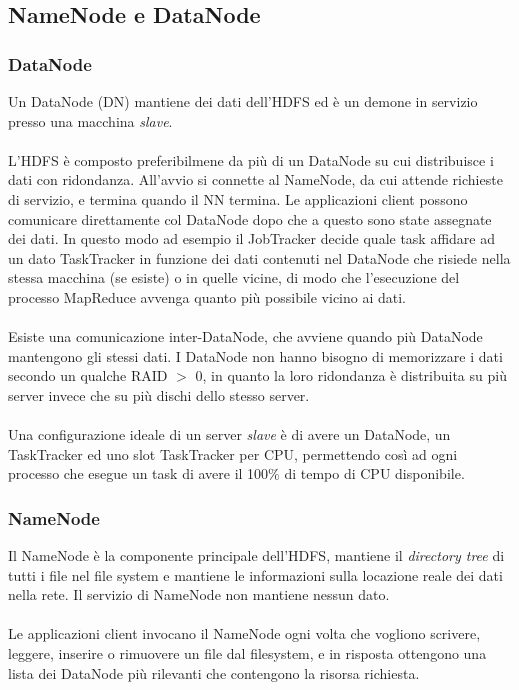 \documentclass[a4paper,11pt]{report}
\begin{document}
\subsection{NameNode e DataNode}
\subsubsection{DataNode}
Un DataNode (DN) mantiene dei dati dell'HDFS ed è un demone in servizio presso una macchina \emph{slave}. 
\paragraph{}
L'HDFS è composto preferibilmene da  più di un DataNode
su cui distribuisce i dati con ridondanza. All'avvio si connette al NameNode, da cui attende richieste di servizio, e termina quando il NN
termina.
Le applicazioni client possono comunicare direttamente col DataNode dopo che a questo sono state assegnate dei dati. In questo modo ad
esempio il JobTracker decide
quale task affidare ad un dato TaskTracker in funzione dei dati contenuti nel DataNode che risiede nella stessa macchina (se esiste) o in
quelle vicine, di modo che l'esecuzione del
processo MapReduce avvenga quanto più possibile vicino ai dati.
\paragraph{}
Esiste una comunicazione inter-DataNode, che avviene quando più DataNode mantengono gli stessi dati.
I DataNode non hanno bisogno di memorizzare i dati secondo un qualche RAID $>$ 0, in quanto la loro ridondanza è distribuita su più server
invece che su più dischi dello stesso server.
\paragraph{}
Una configurazione ideale di un server \emph{slave} è di avere un DataNode, un TaskTracker ed uno slot TaskTracker per CPU, permettendo così
ad ogni processo che esegue un task di 
avere il 100\% di tempo di CPU disponibile.
\subsubsection{NameNode}
Il NameNode è la componente principale dell'HDFS, mantiene il \emph{directory tree} di tutti i file nel file system e mantiene le
informazioni sulla locazione reale dei dati nella rete.
Il servizio di NameNode non mantiene nessun dato.
\paragraph{}
Le applicazioni client invocano il NameNode ogni volta che vogliono scrivere, leggere, inserire o rimuovere un file dal filesystem, e in
risposta ottengono una lista dei DataNode più
rilevanti che contengono la risorsa richiesta. 
\end{document}
